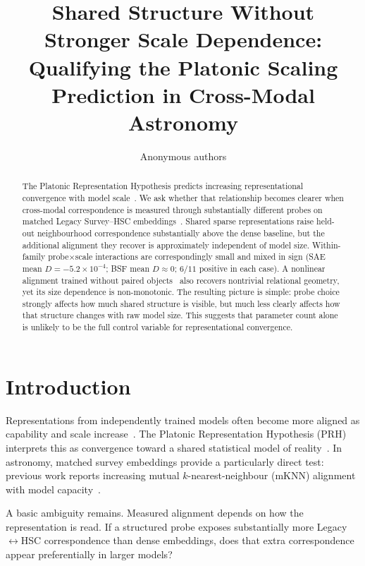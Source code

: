 \documentclass[11pt]{article}
\title{Shared Structure Without Stronger Scale Dependence:\\
Qualifying the Platonic Scaling Prediction in Cross-Modal Astronomy}
\author{Anonymous authors}
\date{}
\begin{document}
\maketitle

\begin{abstract}
The Platonic Representation Hypothesis predicts increasing representational convergence with model scale~\citep{huh2024platonic}.
We ask whether that relationship becomes clearer when cross-modal correspondence is measured through substantially different probes on matched Legacy Survey--HSC embeddings~\citep{duraphe2025platonicuniverse}.
Shared sparse representations raise held-out neighbourhood correspondence substantially above the dense baseline, but the additional alignment they recover is approximately independent of model size.
Within-family probe\(\times\)scale interactions are correspondingly small and mixed in sign (SAE mean \(D{=}{-}5.2{\times}10^{-4}\); BSF mean \(D{\approx}0\); \(6/11\) positive in each case).
A nonlinear alignment trained without paired objects~\citep{jha2025vec2vec} also recovers nontrivial relational geometry, yet its size dependence is non-monotonic.
The resulting picture is simple: probe choice strongly affects how much shared structure is visible, but much less clearly affects how that structure changes with raw model size.
This suggests that parameter count alone is unlikely to be the full control variable for representational convergence.
\end{abstract}

\section{Introduction}
\label{sec:intro}

Representations from independently trained models often become more aligned as capability and scale increase~\citep{huh2024platonic}.
The Platonic Representation Hypothesis (PRH) interprets this as convergence toward a shared statistical model of reality~\citep{huh2024platonic}.
In astronomy, matched survey embeddings provide a particularly direct test: previous work reports increasing mutual \(k\)-nearest-neighbour (mKNN) alignment with model capacity~\citep{duraphe2025platonicuniverse}.

A basic ambiguity remains.
Measured alignment depends on how the representation is read.
If a structured probe exposes substantially more Legacy\(\leftrightarrow\)HSC correspondence than dense embeddings, does that extra correspondence appear preferentially in larger models?
\end{document}
